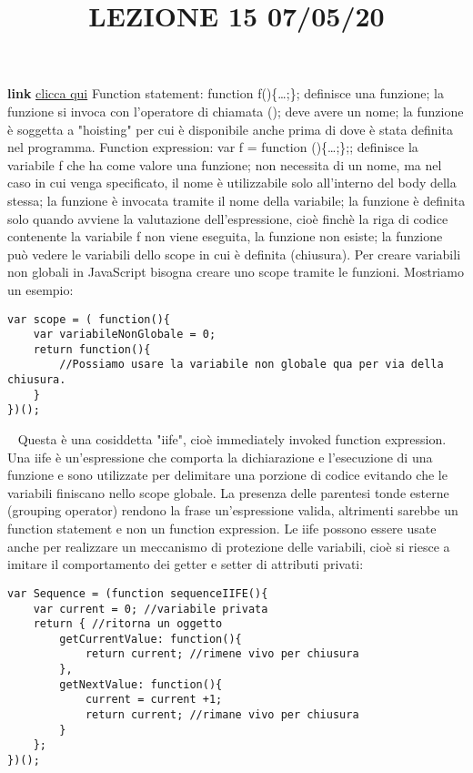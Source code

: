 \title{LEZIONE 15 07/05/20}
\textbf{link} \href{https://web.microsoftstream.com/video/cc735a4e-c7cb-467d-97bd-910450c2d0a3?list=user&userId=cfe0965d-9a7c-40e2-be6e-f078296a1914}{clicca qui}
\newline
\newline
Function statement: function f()\{\dots;\}; definisce una funzione; la funzione si invoca con l'operatore di chiamata (); deve avere un nome; la funzione è soggetta a "hoisting" per cui è disponibile anche prima di dove è stata definita nel programma.\newline
\newline
Function expression: var f = function ()\{\dots;\};; definisce la variabile f che ha come valore una funzione; non necessita di un nome, ma nel caso in cui venga specificato, il nome è utilizzabile solo all'interno del body della stessa; la funzione è invocata tramite il nome della variabile; la funzione è definita solo quando avviene la valutazione dell'espressione, cioè finchè la riga di codice contenente la variabile f non viene eseguita, la funzione non esiste; la funzione può vedere le variabili dello scope in cui è definita (chiusura).\newline
\newline
Per creare variabili non globali in JavaScript bisogna creare uno scope tramite le funzioni. Mostriamo un esempio:
\begin{lstlisting}
var scope = ( function(){
    var variabileNonGlobale = 0;
    return function(){
        //Possiamo usare la variabile non globale qua per via della chiusura.
    }
})();
\end{lstlisting}
\ \newline
Questa è una cosiddetta "iife", cioè immediately invoked function expression.\newline
Una iife è un'espressione che comporta la dichiarazione e l'esecuzione di una funzione e sono utilizzate per delimitare una porzione di codice evitando che le variabili finiscano nello scope globale.\newline
La presenza delle parentesi tonde esterne (grouping operator) rendono la frase un'espressione valida, altrimenti sarebbe un function statement e non un function expression.\newline
Le iife possono essere usate anche per realizzare un meccanismo di protezione delle variabili, cioè si riesce a imitare il comportamento dei getter e setter di attributi privati:
\begin{lstlisting}
var Sequence = (function sequenceIIFE(){
    var current = 0; //variabile privata
    return { //ritorna un oggetto
        getCurrentValue: function(){
            return current; //rimene vivo per chiusura
        },
        getNextValue: function(){
            current = current +1;
            return current; //rimane vivo per chiusura
        }
    };
})();
\end{lstlisting}
